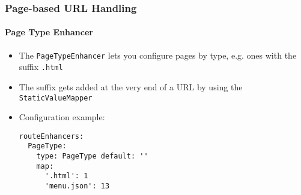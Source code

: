 
\begin{frame}[fragile]
	\frametitle{Page-based URL Handling}
	\framesubtitle{Page Type Enhancer}

	\lstset{basicstyle=\smaller\ttfamily}

	\begin{itemize}
		\item The \texttt{PageTypeEnhancer} lets you configure pages by type,
			e.g. ones with the suffix \texttt{.html}
		\item The suffix gets added at the very end of a URL by using the
			\texttt{StaticValueMapper}
		\item Configuration example:

\begin{lstlisting}
routeEnhancers:
  PageType:
    type: PageType default: ''
	map:
	  '.html': 1
	  'menu.json': 13
\end{lstlisting}

	\end{itemize}

\end{frame}

